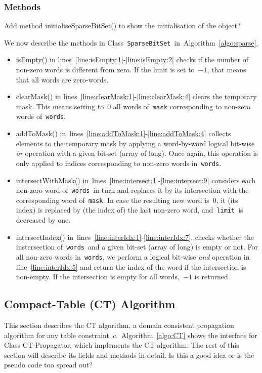 \documentclass[a4paper,11pt]{article}
\newcommand{\Todo}[1]{{\color{blue}#1}}
\newcommand{\Algoref}[1]{Algorithm~\ref{#1}}
\newcommand{\linesref}[2]{lines~\ref{#1}-\ref{#2}}
\newcommand{\Words}{\texttt{words}}
\newcommand{\Mask}{\texttt{mask}}
\newcommand{\Limit}{\texttt{limit}}
\newcommand{\SparseBitSet}{\texttt{SparseBitSet}}
\numberwithin{equation}{section}
\begin{document}
\subsubsection{Methods}
\Todo{Add method initialiseSparseBitSet() to show the initialisation of the 
  object?}

We now describe the methods in Class~\SparseBitSet~in~\Algoref{algo:sparse}.

\begin{itemize}
  \item isEmpty() in lines~\ref{line:isEmpty:1}-\ref{line:isEmpty:2} checks
    if the number of non-zero words is different from zero. If the limit is
    set to~$-1$, that means that all words are zero-words.

  \item clearMask() in lines~\ref{line:clearMask:1}-\ref{line:clearMask:4}
    clears the temporary mask. This means setting to~$0$ all words of~$\Mask$
    corresponding to non-zero words of~\Words.

  \item addToMask() in~\linesref{line:addToMask:1}{line:addToMask:4} collects
    elements to the temporary mask by applying a word-by-word logical bit-wise
    \emph{or} operation with a given bit-set (array of long).
    Once again, this operation is only applied to indices corresponding to
    non-zero words in~\Words.

  \item intersectWithMask() in~\linesref{line:intersect:1}{line:intersect:9}
    considers each non-zero word of~\Words~in turn
    and replaces it by its intersection with the corresponding word of~\Mask.
    In case the resulting new word is~$0$, it (its index) is replaced
    by (the index of) the last non-zero word, and~\Limit~is
    decreased by one.
    
  \item intersectIndex() in~\linesref{line:interIdx:1}{line:interIdx:7}.
    checks whether the instersection of~\Words~and a given bit-set
    (array of long) is empty or not. For all non-zero words in~\Words,
    we perform a logical bit-wise \emph{and} operation 
    in line~\ref{line:interIdx:5} and return
    the index of the word if the intersection is non-empty. If the
    intersection is empty for all words,~$-1$ is returned.
\end{itemize}

\subsection{Compact-Table (CT) Algorithm}
This section describes the CT algorithm, a domain consistent propagation
algorithm for any table constraint~$c$.~\Algoref{algo:CT} shows the interface
for Class CT-Propagator, which implements the CT algorithm. The rest of this
section will describe its fields and methods in detail.
\Todo{Is this a good idea or is the pseudo code too spread out?}
\end{document}
